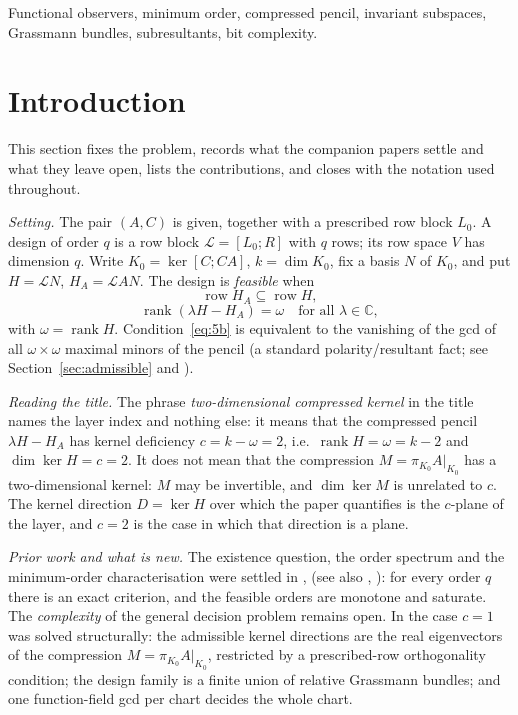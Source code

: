 \documentclass[journal]{IEEEtran}
\theoremstyle{plainn}
\theoremstyle{remark}
\newcommand{\row}{\operatorname{row}}
\newcommand{\rank}{\operatorname{rank}}
\begin{document}
\begin{IEEEkeywords}
Functional observers, minimum order, compressed pencil, invariant subspaces, Grassmann bundles,
subresultants, bit complexity.
\end{IEEEkeywords}

\section{Introduction}\label{sec:intro}

This section fixes the problem, records what the companion papers settle and what they leave open,
lists the contributions, and closes with the notation used throughout.

\emph{Setting.} The pair $(A,C)$ is given, together with a prescribed row block $L_0$. A design of order
$q$ is a row block $\mathcal L=[L_0;R]$ with $q$ rows; its row space $V$ has dimension $q$. Write
$K_0=\ker[C;CA]$, $k=\dim K_0$, fix a basis $N$ of $K_0$, and put $H=\mathcal L N$, $H_A=\mathcal L AN$. The design is
\emph{feasible} when
\begin{equation}\label{eq:5a}
\row H_A\subseteq\row H,
\end{equation}
\begin{equation}\label{eq:5b}
\rank(\lambda H-H_A)=\omega\quad\text{for all }\lambda\in\mathbb C,
\end{equation}
with $\omega=\rank H$. Condition~\eqref{eq:5b} is equivalent to the vanishing of the gcd of all
$\omega\times\omega$ maximal minors of the pencil (a standard polarity/resultant fact; see
Section~\ref{sec:admissible} and \cite{vzgg13}).

\emph{Reading the title.} The phrase \emph{two-dimensional compressed kernel} in the title names the layer
index and nothing else: it means that the compressed pencil $\lambda H-H_A$ has kernel deficiency
$c=k-\omega=2$, i.e.\ $\rank H=\omega=k-2$ and $\dim\ker H=c=2$. It does not mean that the compression
$M=\pi_{K_0}A|_{K_0}$ has a two-dimensional kernel: $M$ may be invertible, and $\dim\ker M$ is unrelated
to $c$. The kernel direction $D=\ker H$ over which the paper quantifies is the $c$-plane of the layer,
and $c=2$ is the case in which that direction is a plane.

\emph{Prior work and what is new.} The existence question, the order spectrum and the minimum-order
characterisation were settled in \cite{companion1}, \cite{companion2} (see also \cite{fer26a},
\cite{fer26b}): for every order $q$ there is an exact criterion, and the feasible orders are monotone and
saturate. The \emph{complexity} of the general decision problem remains open. In \cite{companion3} the
case $c=1$ was solved structurally: the admissible kernel directions are the real eigenvectors of the
compression $M=\pi_{K_0}A|_{K_0}$, restricted by a prescribed-row orthogonality condition; the design
family is a finite union of relative Grassmann bundles; and one function-field gcd per chart decides the
whole chart.
\end{document}
